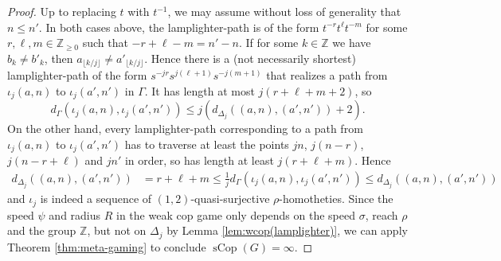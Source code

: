 \documentclass{amsart}
\theoremstyle{definition}
\theoremstyle{remark}
\theoremstyle{remark}
\theoremstyle{definition}
\newcommand{\sCop}{\operatorname{sCop}}
\newcommand{\Z}{\mathbb{Z}} %
\newcommand{\floor}[1]{\lfloor #1 \rfloor}
\renewcommand{\leq}{\leqslant}
\renewcommand{\geq}{\geqslant}
\begin{document}
\begin{proof}
	Up to replacing $t$ with $t^{-1}$, we may assume without loss of generality that $n \leq n'$.
    In both cases above, the lamplighter-path is of the form $t^{-r}t^{\ell}t^{-m}$ for some \(r, \ell, m \in \mathbb{Z}_{\geq 0}\) such that \(-r+\ell-m = n'-n \).
    If for some \(k \in \Z\) we have \(b_k \neq b'_k\), then \(a_{\floor{k/j}} \neq a'_{\floor{k/j}}\). Hence there is a (not necessarily shortest) lamplighter-path of the form $s^{-jr}s^{j(\ell+1)} s^{-j(m+1)}$ that realizes a path from $\iota_j(a,n)$ to $\iota_j(a',n')$ in $\Gamma$. It has length at most \(j(r+\ell+m+2)\), so
    $$
    d_\Gamma(\iota_j(a,n), \iota_j(a',n')) \leq j(d_{\Delta_j}((a,n),(a',n')) + 2 ).
    $$
    On the other hand, every lamplighter-path corresponding to a path from \(\iota_j(a, n)\) to \(\iota_j(a', n')\) has to traverse at least the points $jn$, \(j(n - r)\), \(j(n - r + \ell)\) and \(jn'\) in order, so has length at least \(j(r+\ell+m)\).
	Hence \begin{align*}
		d_{\Delta_j}\left((a, n), (a', n')\right) &= r+\ell+m \leq \frac 1j d_\Gamma\left(\iota_j(a, n), \iota_j(a', n')\right) \leq d_{\Delta_j}\left((a, n), (a', n')\right)
	\end{align*} and \(\iota_j\) is indeed a sequence of $(1,2)$-quasi-surjective $\rho$-homotheties. Since the speed $\psi$ and radius $R$ in the weak cop game only depends on the speed $\sigma$, reach $\rho$ and the group $\mathbb{Z}$, but not on $\Delta_j$ by Lemma \ref{lem:wcop(lamplighter)}, we can apply Theorem \ref{thm:meta-gaming} to conclude $\sCop(G)= \infty$.
\end{proof}


\newpage %
\end{document}
